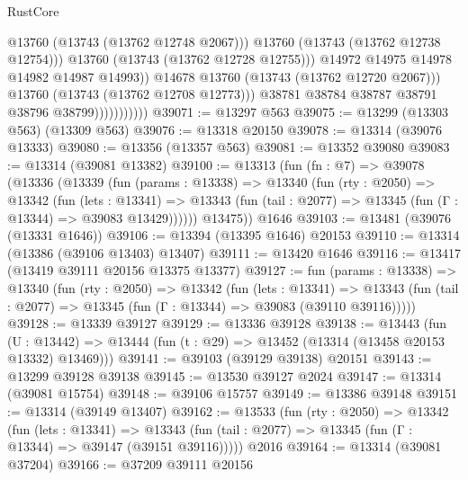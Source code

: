 \begin{lexlean}{RustCore}
\begin{coremodule}
                                        @13760
                                        (@13743 (@13762 @12748 @2067)))
                                      @13760
                                      (@13743 (@13762 @12738 @12754)))
                                    @13760
                                    (@13743 (@13762 @12728 @12755)))
                                  @14972
                                  @14975
                                  @14978
                                  @14982
                                  @14987
                                  @14993))
                              @14678
                              @13760
                              (@13743 (@13762 @12720 @2067)))
                            @13760
                            (@13743 (@13762 @12708 @12773)))
                          @38781
                          @38784
                          @38787
                          @38791
                          @38796
                          @38799)))))))))))
@39071 := @13297 @563
@39075 := @13299 (@13303 @563) (@13309 @563)
@39076 := @13318 @20150
@39078 := @13314 (@39076 @13333)
@39080 := @13356 (@13357 @563)
@39081 := @13352 @39080
@39083 := @13314 (@39081 @13382)
@39100 := @13313
    (fun (fn : @7) =>
    @39078
      (@13336
        (@13339
          (fun (params : @13338) =>
          @13340
            (fun (rty : @2050) =>
            @13342
              (fun (lets : @13341) =>
              @13343 (fun (tail : @2077) => @13345 (fun (Γ : @13344) => @39083 @13429))))))
        @13475))
    @1646
@39103 := @13481 (@39076 (@13331 @1646))
@39106 := @13394 (@13395 @1646) @20153
@39110 := @13314 (@13386 (@39106 @13403) @13407)
@39111 := @13420 @1646
@39116 := @13417 (@13419 @39111 @20156 @13375 @13377)
@39127 := fun (params : @13338) =>
  @13340
    (fun (rty : @2050) =>
    @13342
      (fun (lets : @13341) =>
      @13343 (fun (tail : @2077) => @13345 (fun (Γ : @13344) => @39083 (@39110 @39116)))))
@39128 := @13339 @39127
@39129 := @13336 @39128
@39138 := @13443
    (fun (U : @13442) => @13444 (fun (t : @29) => @13452 (@13314 (@13458 @20153 @13332) @13469)))
@39141 := @39103 (@39129 @39138) @20151
@39143 := @13299 @39128 @39138
@39145 := @13530 @39127 @2024
@39147 := @13314 (@39081 @15754)
@39148 := @39106 @15757
@39149 := @13386 @39148
@39151 := @13314 (@39149 @13407)
@39162 := @13533
    (fun (rty : @2050) =>
    @13342
      (fun (lets : @13341) =>
      @13343 (fun (tail : @2077) => @13345 (fun (Γ : @13344) => @39147 (@39151 @39116)))))
    @2016
@39164 := @13314 (@39081 @37204)
@39166 := @37209 @39111 @20156

\end{coremodule}
\end{lexlean}
